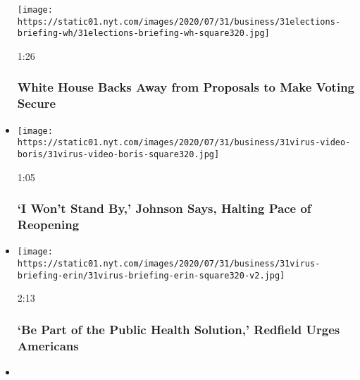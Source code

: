 \begin{itemize}
  \texttt{[image: https://static01.nyt.com/images/2020/07/31/business/31elections-briefing-wh/31elections-briefing-wh-square320.jpg]}

  1:26

  \hypertarget{white-house-backs-away-from-proposals-to-make-voting-secure}{%
  \subsubsection{White House Backs Away from Proposals to Make Voting
  Secure}\label{white-house-backs-away-from-proposals-to-make-voting-secure}}
\item
  \href{https://www.nytimes.com/video/us/politics/100000007266983/johnson-coronavirus-restrictions.html?action=click\&module=video-series-bar\&region=header\&pgtype=Article\&playlistId=video/latest-video}{}

  \texttt{[image: https://static01.nyt.com/images/2020/07/31/business/31virus-video-boris/31virus-video-boris-square320.jpg]}

  1:05

  \hypertarget{i-wont-stand-by-johnson-says-halting-pace-of-reopening}{%
  \subsubsection{`I Won't Stand By,' Johnson Says, Halting Pace of
  Reopening}\label{i-wont-stand-by-johnson-says-halting-pace-of-reopening}}
\item
  \href{https://www.nytimes.com/video/us/politics/100000007266691/fauci-congress-testimony.html?action=click\&module=video-series-bar\&region=header\&pgtype=Article\&playlistId=video/latest-video}{}

  \texttt{[image: https://static01.nyt.com/images/2020/07/31/business/31virus-briefing-erin/31virus-briefing-erin-square320-v2.jpg]}

  2:13

  \hypertarget{be-part-of-the-public-health-solution-redfield-urges-americans}{%
  \subsubsection{`Be Part of the Public Health Solution,' Redfield Urges
  Americans}\label{be-part-of-the-public-health-solution-redfield-urges-americans}}
\item
  \href{https://www.nytimes.com/video/movies/100000007265338/palm-springs-scene.html?action=click\&module=video-series-bar\&region=header\&pgtype=Article\&playlistId=video/latest-video}{}


\end{itemize}
